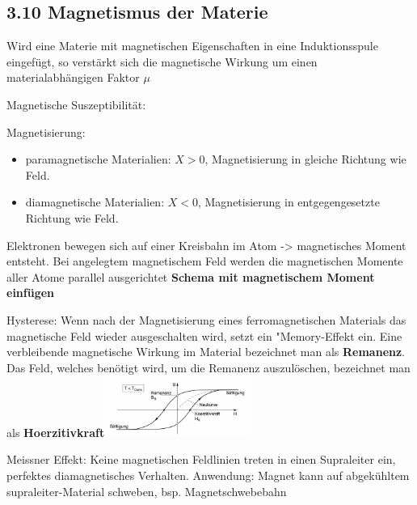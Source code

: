 \subsection*{3.10 Magnetismus der Materie}
    Wird eine Materie mit magnetischen Eigenschaften in eine Induktionsspule eingefügt, so verstärkt sich die magnetische Wirkung um einen materialabhängigen Faktor $\mu$

    Magnetische Suszeptibilität:

    Magnetisierung:
    \begin{itemize}
        \item paramagnetische Materialien: $X > 0$, Magnetisierung in gleiche Richtung wie Feld. 
        \item diamagnetische Materialien: $X < 0$, Magnetisierung in entgegengesetzte Richtung wie Feld.
    \end{itemize}

    Elektronen bewegen sich auf einer Kreisbahn im Atom -> magnetisches Moment entsteht. Bei angelegtem magnetischem Feld werden die magnetischen Momente aller Atome parallel ausgerichtet
    \textbf{Schema mit magnetischem Moment einfügen}

    Hysterese: Wenn nach der Magnetisierung eines ferromagnetischen Materials das magnetische Feld wieder ausgeschalten wird, setzt ein "Memory-Effekt ein.
    Eine verbleibende magnetische Wirkung im Material bezeichnet man als \textbf{Remanenz}.
    Das Feld, welches benötigt wird, um die Remanenz auszulöschen, bezeichnet man als \textbf{Hoerzitivkraft}
        \includegraphics[height = 20mm]{src/images/permanentmagnet.png}

    Meissner Effekt: Keine magnetischen Feldlinien treten in einen Supraleiter ein, perfektes diamagnetisches Verhalten.
    Anwendung: Magnet kann auf abgekühltem supraleiter-Material schweben, bsp. Magnetschwebebahn